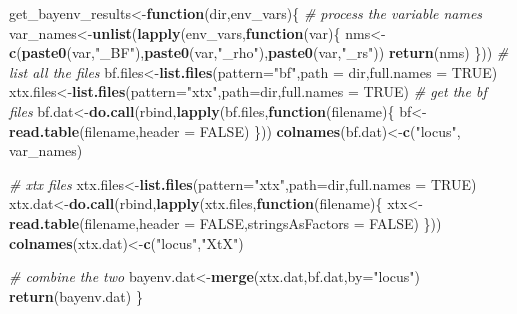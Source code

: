 \documentclass[11pt,]{article}
\newenvironment{Shaded}{\begin{snugshade}}{\end{snugshade}}
\newcommand{\KeywordTok}[1]{\textcolor[rgb]{0.13,0.29,0.53}{\textbf{#1}}}
\newcommand{\DataTypeTok}[1]{\textcolor[rgb]{0.13,0.29,0.53}{#1}}
\newcommand{\StringTok}[1]{\textcolor[rgb]{0.31,0.60,0.02}{#1}}
\newcommand{\CommentTok}[1]{\textcolor[rgb]{0.56,0.35,0.01}{\textit{#1}}}
\newcommand{\OtherTok}[1]{\textcolor[rgb]{0.56,0.35,0.01}{#1}}
\newcommand{\ControlFlowTok}[1]{\textcolor[rgb]{0.13,0.29,0.53}{\textbf{#1}}}
\newcommand{\NormalTok}[1]{#1}
\begin{document}
\begin{Shaded}
\begin{Highlighting}[]
\NormalTok{get_bayenv_results<-}\ControlFlowTok{function}\NormalTok{(dir,env_vars)\{}
  \CommentTok{# process the variable names}
\NormalTok{  var_names<-}\KeywordTok{unlist}\NormalTok{(}\KeywordTok{lapply}\NormalTok{(env_vars,}\ControlFlowTok{function}\NormalTok{(var)\{}
\NormalTok{    nms<-}\KeywordTok{c}\NormalTok{(}\KeywordTok{paste0}\NormalTok{(var,}\StringTok{"_BF"}\NormalTok{),}\KeywordTok{paste0}\NormalTok{(var,}\StringTok{"_rho"}\NormalTok{),}\KeywordTok{paste0}\NormalTok{(var,}\StringTok{"_rs"}\NormalTok{))}
    \KeywordTok{return}\NormalTok{(nms)}
\NormalTok{  \}))}
  \CommentTok{# list all the files}
\NormalTok{  bf.files<-}\KeywordTok{list.files}\NormalTok{(}\DataTypeTok{pattern=}\StringTok{"bf"}\NormalTok{,}\DataTypeTok{path =}\NormalTok{ dir,}\DataTypeTok{full.names =} \OtherTok{TRUE}\NormalTok{)}
\NormalTok{  xtx.files<-}\KeywordTok{list.files}\NormalTok{(}\DataTypeTok{pattern=}\StringTok{"xtx"}\NormalTok{,}\DataTypeTok{path=}\NormalTok{dir,}\DataTypeTok{full.names =} \OtherTok{TRUE}\NormalTok{)}
  \CommentTok{# get the bf files}
\NormalTok{  bf.dat<-}\KeywordTok{do.call}\NormalTok{(rbind,}\KeywordTok{lapply}\NormalTok{(bf.files,}\ControlFlowTok{function}\NormalTok{(filename)\{}
\NormalTok{    bf<-}\KeywordTok{read.table}\NormalTok{(filename,}\DataTypeTok{header =} \OtherTok{FALSE}\NormalTok{)}
\NormalTok{  \}))}
  \KeywordTok{colnames}\NormalTok{(bf.dat)<-}\KeywordTok{c}\NormalTok{(}\StringTok{"locus"}\NormalTok{, var_names)}
  
  \CommentTok{# xtx files}
\NormalTok{  xtx.files<-}\KeywordTok{list.files}\NormalTok{(}\DataTypeTok{pattern=}\StringTok{"xtx"}\NormalTok{,}\DataTypeTok{path=}\NormalTok{dir,}\DataTypeTok{full.names =} \OtherTok{TRUE}\NormalTok{)}
\NormalTok{  xtx.dat<-}\KeywordTok{do.call}\NormalTok{(rbind,}\KeywordTok{lapply}\NormalTok{(xtx.files,}\ControlFlowTok{function}\NormalTok{(filename)\{}
\NormalTok{    xtx<-}\KeywordTok{read.table}\NormalTok{(filename,}\DataTypeTok{header =} \OtherTok{FALSE}\NormalTok{,}\DataTypeTok{stringsAsFactors =} \OtherTok{FALSE}\NormalTok{)}
\NormalTok{  \}))}
  \KeywordTok{colnames}\NormalTok{(xtx.dat)<-}\KeywordTok{c}\NormalTok{(}\StringTok{"locus"}\NormalTok{,}\StringTok{"XtX"}\NormalTok{)}
  
  \CommentTok{# combine the two}
\NormalTok{  bayenv.dat<-}\KeywordTok{merge}\NormalTok{(xtx.dat,bf.dat,}\DataTypeTok{by=}\StringTok{"locus"}\NormalTok{)}
  \KeywordTok{return}\NormalTok{(bayenv.dat)}
\NormalTok{\}}
\end{Highlighting}
\end{Shaded}
\end{document}
